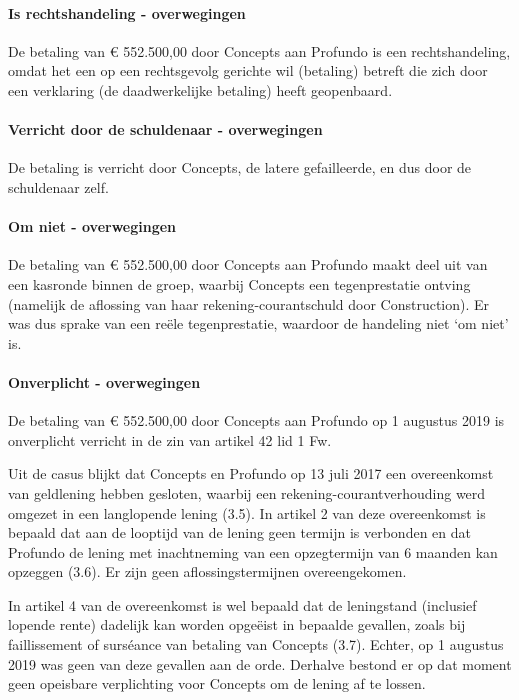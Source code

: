 \documentclass[
  dutch,
  a4paper,
]{article}
\begin{document}
\paragraph{Is rechtshandeling - overwegingen}\label{is-rechtshandeling---overwegingen-42}

De betaling van € 552.500,00 door Concepts aan Profundo is een rechtshandeling, omdat het een op een rechtsgevolg gerichte wil (betaling) betreft die zich door een verklaring (de daadwerkelijke betaling) heeft geopenbaard.

\paragraph{Verricht door de schuldenaar - overwegingen}\label{verricht-door-de-schuldenaar---overwegingen-42}

De betaling is verricht door Concepts, de latere gefailleerde, en dus door de schuldenaar zelf.

\paragraph{Om niet - overwegingen}\label{om-niet---overwegingen-42}

De betaling van € 552.500,00 door Concepts aan Profundo maakt deel uit van een kasronde binnen de groep, waarbij Concepts een tegenprestatie ontving (namelijk de aflossing van haar rekening-courantschuld door Construction). Er was dus sprake van een reële tegenprestatie, waardoor de handeling niet `om niet' is.

\paragraph{Onverplicht - overwegingen}\label{onverplicht---overwegingen-42}

De betaling van € 552.500,00 door Concepts aan Profundo op 1 augustus 2019 is onverplicht verricht in de zin van artikel 42 lid 1 Fw.

Uit de casus blijkt dat Concepts en Profundo op 13 juli 2017 een overeenkomst van geldlening hebben gesloten, waarbij een rekening-courantverhouding werd omgezet in een langlopende lening (3.5). In artikel 2 van deze overeenkomst is bepaald dat aan de looptijd van de lening geen termijn is verbonden en dat Profundo de lening met inachtneming van een opzegtermijn van 6 maanden kan opzeggen (3.6). Er zijn geen aflossingstermijnen overeengekomen.

In artikel 4 van de overeenkomst is wel bepaald dat de leningstand (inclusief lopende rente) dadelijk kan worden opgeëist in bepaalde gevallen, zoals bij faillissement of surséance van betaling van Concepts (3.7). Echter, op 1 augustus 2019 was geen van deze gevallen aan de orde. Derhalve bestond er op dat moment geen opeisbare verplichting voor Concepts om de lening af te lossen.
\end{document}
